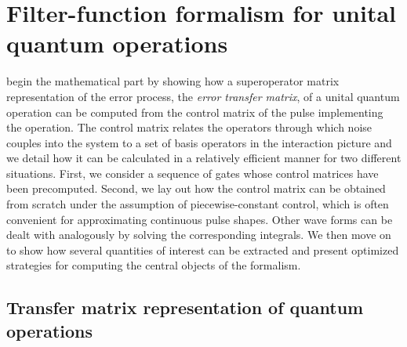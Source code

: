 \chapter{Filter-function formalism for unital quantum operations}\label{ch:ff:theory}
 begin the mathematical part by showing how a superoperator matrix representation of the error process, the \emph{error transfer matrix}, of a unital quantum operation can be computed from the control matrix of the pulse implementing the operation.
The control matrix relates the operators through which noise couples into the system to a set of basis operators in the interaction picture and we detail how it can be calculated in a relatively efficient manner for two different situations.
First, we consider a sequence of gates whose control matrices have been precomputed.
Second, we lay out how the control matrix can be obtained from scratch under the assumption of piecewise-constant control, which is often convenient for approximating continuous pulse shapes.
Other wave forms can be dealt with analogously by solving the corresponding integrals.
We then move on to show how several quantities of interest can be extracted and present optimized strategies for computing the central objects of the formalism.

\section{Transfer matrix representation of quantum operations}\label{sec:ff:theory:transfer_matrix}
